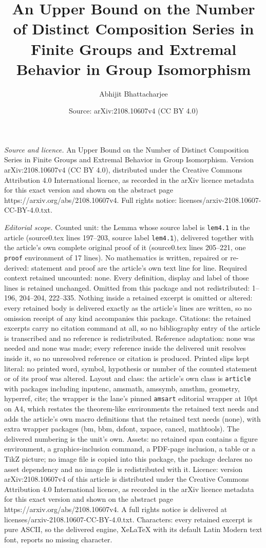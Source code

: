 \documentclass[10pt,a4paper]{amsart}
\title[An Upper Bound on the Number of Distinct Composition Series ]{An Upper Bound on the Number of Distinct Composition Series in Finite Groups and Extremal Behavior in Group Isomorphism}
\author{Abhijit Bhattacharjee}
\date{Source: arXiv:2108.10607v4 (CC BY 4.0)}
\begin{document}
\maketitle

\noindent\emph{Source and licence.} An Upper Bound on the Number of Distinct Composition Series in Finite Groups and Extremal Behavior in Group Isomorphism. Version arXiv:2108.10607v4 (CC BY 4.0), distributed under the Creative Commons Attribution 4.0 International licence, as recorded in the arXiv licence metadata for this exact version and shown on the abstract page https://arxiv.org/abs/2108.10607v4. Full rights notice: licenses/arxiv-2108.10607-CC-BY-4.0.txt.\par\smallskip

\noindent\textit{Editorial scope.} Counted unit: the Lemma whose source label is \texttt{lem4.1} in the article (source0.tex lines 197--203, source label \texttt{lem4.1}), delivered together with the article's own complete original proof of it (source0.tex lines 205--221, one \texttt{proof} environment of 17 lines). No mathematics is written, repaired or re-derived: statement and proof are the article's own text line for line. Required context retained uncounted: none. Every definition, display and label of those lines is retained unchanged. Omitted from this package and not redistributed: 1--196, 204--204, 222--335. Nothing inside a retained excerpt is omitted or altered: every retained body is delivered exactly as the article's lines are written, so no omission receipt of any kind accompanies this package. Citations: the retained excerpts carry no citation command at all, so no bibliography entry of the article is transcribed and no reference is redistributed. Reference adaptation: none was needed and none was made; every reference inside the delivered unit resolves inside it, so no unresolved reference or citation is produced. Printed slips kept literal: no printed word, symbol, hypothesis or number of the counted statement or of its proof was altered. Layout and class: the article's own class is \texttt{article} with packages including inputenc, amsmath, amssymb, amsthm, geometry, hyperref, cite; the wrapper is the lane's pinned \texttt{amsart} editorial wrapper at 10pt on A4, which restates the theorem-like environments the retained text needs and adds the article's own macro definitions that the retained text needs (none), with extra wrapper packages (bm, bbm, dsfont, xspace, cancel, mathtools). The delivered numbering is the unit's own. Assets: no retained span contains a figure environment, a graphics-inclusion command, a PDF-page inclusion, a table or a TikZ picture; no image file is copied into this package, the package declares no asset dependency and no image file is redistributed with it. Licence: version arXiv:2108.10607v4 of this article is distributed under the Creative Commons Attribution 4.0 International licence, as recorded in the arXiv licence metadata for this exact version and shown on the abstract page https://arxiv.org/abs/2108.10607v4. A full rights notice is delivered at licenses/arxiv-2108.10607-CC-BY-4.0.txt. Characters: every retained excerpt is pure ASCII, so the delivered engine, XeLaTeX with its default Latin Modern text font, reports no missing character.
\end{document}
